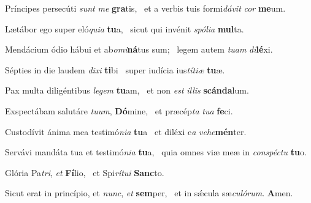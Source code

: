 \item Príncipes persecúti \textit{sunt} \textit{me} \textbf{gra}tis,~\psstar{} et a verbis tuis formi\textit{dávit} \textit{cor} \textbf{me}um.

\item Lætábor ego super eló\textit{quia} \textbf{tu}a,~\psstar{} sicut qui invénit \textit{spólia} \textbf{mul}ta.

\item Mendácium ódio hábui et ab\textit{omi}\textbf{ná}tus sum;~\psstar{} legem autem \textit{tuam} \textit{di}\textbf{lé}xi.

\item Sépties in die laudem \textit{dixi} \textbf{ti}bi~\psstar{} super iudícia ius\textit{títiæ} \textbf{tu}æ.

\item Pax multa diligéntibus \textit{legem} \textbf{tu}am,~\psstar{} et non \textit{est} \textit{illis} \textbf{scán}\textbf{da}lum.

\item Exspectábam salutáre \textit{tuum}, \textbf{Dó}mine,~\psstar{} et præcép\textit{ta} \textit{tua} \textbf{fe}ci.

\item Custodívit ánima mea testimó\textit{nia} \textbf{tu}a~\psstar{} et diléxi e\textit{a} \textit{vehe}\textbf{mén}ter.

\item Servávi mandáta tua et testimó\textit{nia} \textbf{tu}a,~\psstar{} quia omnes viæ meæ in \textit{conspéctu} \textbf{tu}o.

\item Glória Pa\textit{tri}, \textit{et} \textbf{Fí}lio,~\psstar{} et Spi\textit{rítui} \textbf{Sanc}to.

\item Sicut erat in princípio, et \textit{nunc}, \textit{et} \textbf{sem}per,~\psstar{} et in sǽcula sæ\textit{culórum}. \textbf{A}men.